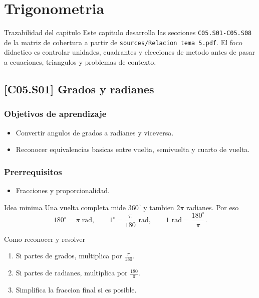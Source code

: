 \chapter{Trigonometria}

\begin{theorybox}{Trazabilidad del capitulo}
Este capitulo desarrolla las secciones \texttt{C05.S01-C05.S08} de la matriz de cobertura a
partir de \texttt{sources/Relacion tema 5.pdf}. El foco didactico es controlar unidades,
cuadrantes y elecciones de metodo antes de pasar a ecuaciones, triangulos y problemas de
contexto.
\end{theorybox}

\section{[C05.S01] Grados y radianes}

\subsection*{Objetivos de aprendizaje}
\begin{itemize}
  \item Convertir angulos de grados a radianes y viceversa.
  \item Reconocer equivalencias basicas entre vuelta, semivuelta y cuarto de vuelta.
\end{itemize}

\subsection*{Prerrequisitos}
\begin{itemize}
  \item Fracciones y proporcionalidad.
\end{itemize}

\begin{theorybox}{Idea minima}
Una vuelta completa mide \(360^\circ\) y tambien \(2\pi\) radianes. Por eso
\[
180^\circ=\pi \text{ rad},\qquad 1^\circ=\frac{\pi}{180}\text{ rad},\qquad
1\text{ rad}=\frac{180^\circ}{\pi}.
\]
\end{theorybox}

\begin{methodbox}{Como reconocer y resolver}
\begin{enumerate}
  \item Si partes de grados, multiplica por \(\frac{\pi}{180}\).
  \item Si partes de radianes, multiplica por \(\frac{180}{\pi}\).
  \item Simplifica la fraccion final si es posible.
\end{enumerate}
\end{methodbox}

